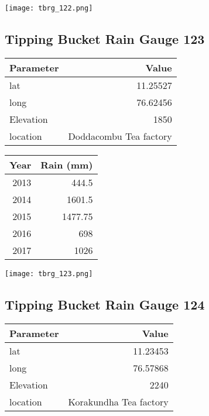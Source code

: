 \documentclass[a4paper]{article}
\begin{document}
\begin{center}
\texttt{[image: tbrg\_122.png]}
\end{center}

\subsection*{Tipping Bucket Rain Gauge 123}
\label{sec:org867093c}

\begin{center}
\begin{tabular}{lr}
Parameter & Value\\
\hline
lat & 11.25527\\
long & 76.62456\\
Elevation & 1850\\
location & Doddacombu Tea factory\\
\end{tabular}
\end{center}

\begin{center}
\begin{tabular}{rr}
Year & Rain (mm)\\
\hline
2013 & 444.5\\
2014 & 1601.5\\
2015 & 1477.75\\
2016 & 698\\
2017 & 1026\\
\end{tabular}
\end{center}

\begin{center}
\texttt{[image: tbrg\_123.png]}
\end{center}

\newpage

\subsection*{Tipping Bucket Rain Gauge 124}
\label{sec:org95377a5}

\begin{center}
\begin{tabular}{lr}
Parameter & Value\\
\hline
lat & 11.23453\\
long & 76.57868\\
Elevation & 2240\\
location & Korakundha Tea factory\\
\end{tabular}
\end{center}
\end{document}
